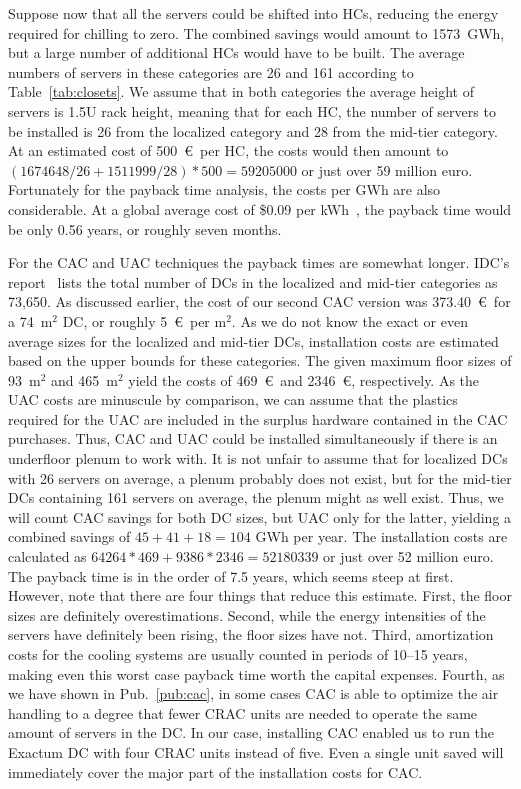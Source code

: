 \documentclass[officiallayout]{tktla}
\begin{document}
Suppose now that all the servers could be shifted into HCs, reducing the
energy required for chilling to zero. The combined savings would amount to
1573~GWh, but a large number of additional HCs would have to be built. The
average numbers of servers in these categories are 26 and 161 according to
Table~\ref{tab:closets}. We assume that in both categories the average height
of servers is 1.5U rack height, meaning that for each HC, the number of
servers to be installed is 26 from the localized category and 28 from the
mid-tier category. At an estimated cost of 500~\euro\ per HC, the costs would
then amount to $(1674648/26+1511999/28)*500=59205000$ or just over 59 million
euro. Fortunately for the payback time analysis, the costs per GWh are also
considerable.  At a global average cost of \$0.09 per kWh~\cite{Zittel2010},
the payback time would be only 0.56 years, or roughly seven months.

For the CAC and UAC techniques the payback times are somewhat longer. IDC's
report~\cite{Bailey2006} lists the total number of DCs in the localized and
mid-tier categories as 73,650. As discussed earlier, the cost of our second
CAC version was 373.40~\euro\ for a 74~m$^2$ DC, or roughly 5~\euro\ per
m$^2$.  As we do not know the exact or even average sizes for the localized
and mid-tier DCs, installation costs are estimated based on the upper bounds
for these categories. The given maximum floor sizes of 93~m$^2$ and 465~m$^2$
yield the costs of 469~\euro\ and 2346~\euro, respectively. As the UAC costs
are minuscule by comparison, we can assume that the plastics required for the
UAC are included in the surplus hardware contained in the CAC purchases. Thus,
CAC and UAC could be installed simultaneously if there is an underfloor plenum
to work with. It is not unfair to assume that for localized DCs with 26
servers on average, a plenum probably does not exist, but for the mid-tier DCs
containing 161 servers on average, the plenum might as well exist. Thus, we
will count CAC savings for both DC sizes, but UAC only for the latter,
yielding a combined savings of $45+41+18=104$ GWh per year. The installation
costs are calculated as $64264*469+9386*2346=52180339$ or just over 52 million
euro. The payback time is in the order of 7.5 years, which seems steep at
first. However, note that there are four things that reduce this estimate.
First, the floor sizes are definitely overestimations. Second, while the
energy intensities of the servers have definitely been rising, the floor sizes
have not. Third, amortization costs for the cooling systems are usually
counted in periods of 10--15 years, making even this worst case payback time
worth the capital expenses. Fourth, as we have shown in Pub.~\ref{pub:cac}, in
some cases CAC is able to optimize the air handling to a degree that fewer
CRAC units are needed to operate the same amount of servers in the DC. In our
case, installing CAC enabled us to run the Exactum DC with four CRAC units
instead of five. Even a single unit saved will immediately cover the major
part of the installation costs for CAC.
\end{document}
